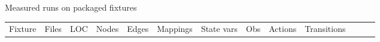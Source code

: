 \documentclass[
  ignorenonframetext,
]{beamer}
\newcounter{none} %
\begin{document}
\begin{frame}[fragile]{Measured runs on packaged fixtures}
{\def\LTcaptype{none} %
\begin{longtable}[]{@{}
  >{\raggedright\arraybackslash}p{}
  >{\raggedleft\arraybackslash}p{}
  >{\raggedleft\arraybackslash}p{}
  >{\raggedleft\arraybackslash}p{}
  >{\raggedleft\arraybackslash}p{}
  >{\raggedleft\arraybackslash}p{}
  >{\raggedleft\arraybackslash}p{}
  >{\raggedleft\arraybackslash}p{}
  >{\raggedleft\arraybackslash}p{}
  >{\raggedleft\arraybackslash}p{}
  >{\raggedleft\arraybackslash}p{}
  >{\raggedleft\arraybackslash}p{}
  >{\raggedleft\arraybackslash}p{}@{}}
\toprule\noalign{}
\begin{minipage}[b]{\linewidth}\raggedright
Fixture
\end{minipage} & \begin{minipage}[b]{\linewidth}\raggedleft
Files
\end{minipage} & \begin{minipage}[b]{\linewidth}\raggedleft
LOC
\end{minipage} & \begin{minipage}[b]{\linewidth}\raggedleft
Nodes
\end{minipage} & \begin{minipage}[b]{\linewidth}\raggedleft
Edges
\end{minipage} & \begin{minipage}[b]{\linewidth}\raggedleft
Mappings
\end{minipage} & \begin{minipage}[b]{\linewidth}\raggedleft
State vars
\end{minipage} & \begin{minipage}[b]{\linewidth}\raggedleft
Obs
\end{minipage} & \begin{minipage}[b]{\linewidth}\raggedleft
Actions
\end{minipage} & \begin{minipage}[b]{\linewidth}\raggedleft
Transitions
\end{minipage} & \begin{minipage}[b]{\linewidth}\raggedleft

\end{minipage}
\end{longtable}}
\end{frame}
\end{document}
